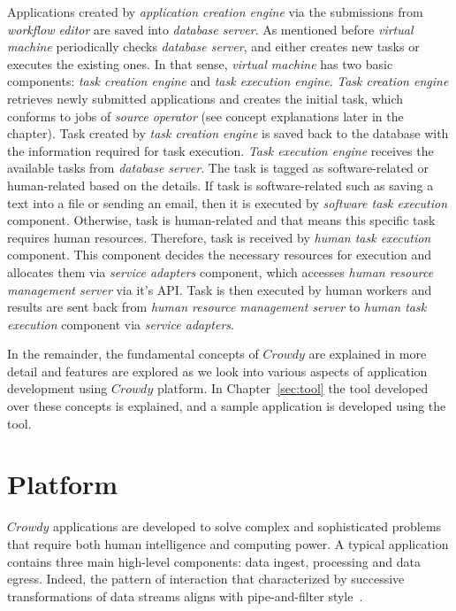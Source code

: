 Applications created by \textit{application creation engine} via the submissions from 
\textit{workflow editor} are saved into \textit{database server}. As mentioned before 
\textit{virtual machine} periodically checks \textit{database server}, and either 
creates new tasks or executes the existing ones. In that sense, \textit{virtual machine} 
has two basic components: \textit{task creation engine} and 
\textit{task execution engine}. \textit{Task creation engine} retrieves newly submitted 
applications and creates the initial task, which conforms to jobs of 
\textit{source operator} (see concept explanations later in the chapter). Task created 
by \textit{task creation engine} is saved back to the database with the information 
required for task execution. \textit{Task execution engine} receives the available 
tasks from \textit{database server}. The task is tagged as software-related or 
human-related based on the details. If task is software-related such as saving 
a text into a file or sending an email, then it is executed by 
\textit{software task execution} component. Otherwise, task is human-related and 
that means this specific task requires human resources. Therefore, task 
is received by \textit{human task execution} component. This component decides 
the necessary resources for execution and allocates them via \textit{service adapters} 
component, which accesses \textit{human resource management server} via it's API. 
Task is then executed by human workers and results are sent back from 
\textit{human resource management server} to \textit{human task execution} 
component via \textit{service adapters}.

In the remainder, the fundamental concepts of $Crowdy$ are explained 
in more detail and features are explored as we look into various aspects of application 
development using $Crowdy$ platform. In Chapter~\ref{sec:tool} the tool developed over 
these concepts is explained, and a sample application is developed using the tool.




\chapter{Platform}
\label{chap:platform}
$Crowdy$ applications are developed to solve complex and sophisticated problems 
that require both human intelligence and computing power. A typical application contains 
three main high-level components: data ingest, processing and data egress. Indeed, 
the pattern of interaction that characterized by successive transformations of data streams 
aligns with pipe-and-filter style~\cite{Clements}.

